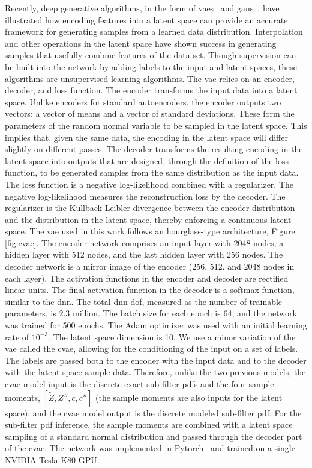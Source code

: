 \documentclass[review]{elsarticle}
\newcommand{\wt}[1]{\widetilde{#1}}
\begin{document}
Recently, deep generative algorithms, in the form of
\glspl{vae}~\cite{Kingma2013, Rezende2014} and
\glspl{gan}~\cite{Goodfellow2014}, have illustrated how encoding
features into a latent space can provide an accurate framework for
generating samples from a learned data distribution. Interpolation and
other operations in the latent space have shown success in generating
samples that usefully combine features of the data set. Though
supervision can be built into the network by adding labels to the
input and latent spaces, these algorithms are unsupervised learning
algorithms. The \gls{vae} relies on an encoder, decoder, and loss
function. The encoder transforms the input data into a latent
space. Unlike encoders for standard autoencoders, the encoder
outputs two vectors: a vector of means and a vector of standard
deviations. These form the parameters of the random normal variable to
be sampled in the latent space. This implies that, given the same
data, the encoding in the latent space will differ slightly on
different passes. The decoder transforms the resulting encoding in
the latent space into outputs that are designed, through the definition
of the loss function, to be generated samples from the same
distribution as the input data. The loss function is a negative
log-likelihood combined with a regularizer. The negative
log-likelihood measures the reconstruction loss by the decoder. The
regularizer is the Kullback-Leibler divergence between the encoder
distribution and the distribution in the latent space, thereby
enforcing a continuous latent space. The \gls{vae}
used in this work follows an hourglass-type architecture,
Figure\,\ref{fig:cvae}. The encoder network comprises an input
layer with 2048 nodes, a hidden layer with 512 nodes, and the last
hidden layer with 256 nodes. The decoder network is a mirror image of
the encoder (256, 512, and 2048 nodes in each layer). The activation
functions in the encoder and decoder are rectified linear units. The
final activation function in the decoder is a softmax function,
similar to the \gls{dnn}. The total \gls{dnn} \gls{dof}, measured as
the number of trainable parameters, is 2.3 million. The batch size for
each epoch is 64, and the network was trained for 500 epochs. The Adam
optimizer was used with an initial learning rate of $10^{-3}$. The
latent space dimension is 10. We use a minor variation of the
\gls{vae} called the \gls{cvae}, allowing for the conditioning of
the input on a set of labels. The labels are passed both to the
encoder with the input data and to the decoder with the latent space
sample data. Therefore, unlike the two previous models, the
\gls{cvae} model input is the discrete exact sub-filter \glspl{pdf}
and the four sample moments,
$\left[ \wt{Z}, \wt{Z''}, \wt{c}, \wt{c''} \right]$ (the sample
moments are also inputs for the latent space); and the \gls{cvae}
model output is the discrete modeled sub-filter \gls{pdf}. For
the sub-filter \gls{pdf} inference, the sample moments are combined with a
latent space sampling of a standard normal distribution and passed
through the decoder part of the \gls{cvae}. The network was
implemented in Pytorch~\cite{Paszke2017} and trained on a single
NVIDIA Tesla K80 GPU.
\end{document}
